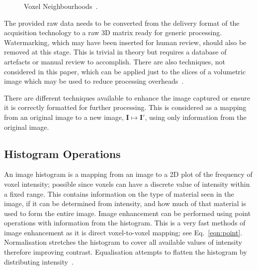 \documentclass[journal]{IEEEtran}
\begin{document}
\begin{figure}
	\centering
\caption{Voxel Neighbourhoods~\cite{lohmann1998volumetric}.}
\label{fig:neighbourhood}
\end{figure}


The provided raw data needs to be converted from the delivery format of the acquisition technology to a raw 3D matrix ready for generic processing.
Watermarking, which may have been inserted for human review, should also be removed at this stage. 
This is trivial in theory but requires a database of artefacts or manual review to accomplish.
There are also techniques, not considered in this paper, which can be applied just to the slices of a volumetric image which may be used to reduce processing overheads~\cite{harauz86exact}.

There are different techniques available to enhance the image captured or ensure it is correctly formatted for further processing.
This is considered as a mapping from an original image to a new image, $\textbf{I} \mapsto \textbf{I}'$, using only information from the original image.

\subsection{Histogram Operations}

An image histogram is a mapping from an image to a 2D plot of the frequency of voxel intensity; possible since voxels can have a discrete value of intensity within a fixed range.
This contains information on the type of material seen in the image, if it can be determined from intensity, and how much of that material is used to form the entire image.
Image enhancement can be performed using point operations with information from the histogram.
This is a very fast methods of image enhancement as it is direct voxel-to-voxel mapping; see Eq.~\eqref{eqn:point}. 
Normalisation stretches the histogram to cover all available values of intensity therefore improving contrast.
Equalisation attempts to flatten the histogram by distributing intensity~\cite{nixon02feature}.
\end{document}
